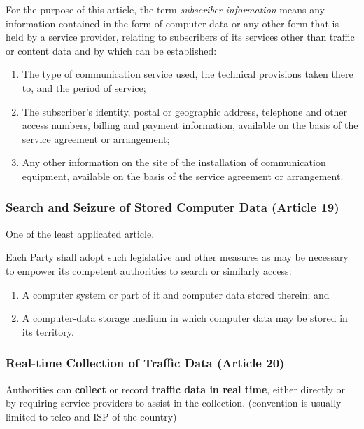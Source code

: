 For the purpose of this article, the term \textit{subscriber information} means any information contained in the form of computer data or any other form that is held by a service provider, relating to subscribers of its services other than traffic or content data and by which can be established:

\begin{enumerate}[itemsep=0pt]
    \item The type of communication service used, the technical provisions taken there to, and the period of service;
    \item The subscriber’s identity, postal or geographic address, telephone and other access numbers, billing and payment information, available on the basis of the service agreement or arrangement;
    \item Any other information on the site of the installation of communication equipment, available on the basis of the service agreement or arrangement.
\end{enumerate}



\subsubsection{Search and Seizure of Stored Computer Data (Article 19)}

\begin{boxH}
  One of the least applicated article.
\end{boxH}

Each Party shall adopt such legislative and other measures as may be necessary to empower its competent authorities to search or similarly access:

\begin{enumerate}[itemsep=0pt]
    \item A computer system or part of it and computer data stored therein; and
    \item A computer-data storage medium in which computer data may be stored in its territory.
\end{enumerate}

\subsubsection{Real-time Collection of Traffic Data (Article 20)}

Authorities can \textbf{collect} or record \textbf{traffic data in real time}, either directly or by requiring service providers to assist in the collection. (convention is usually limited to telco and ISP of the country)

